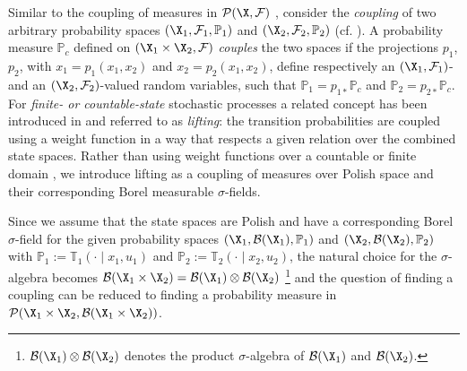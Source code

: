 \documentclass[letterpaper, 10 pt, conference]{amsart}
\theoremstyle{definition}
\theoremstyle{example}
\theoremstyle{remark}
\newcommand{\po}{\mathbb{P}}     \newcommand{\p}[1]{\po\left(#1\right)}     \newcommand{\pd}[1]{p\left(#1\right)}     \newcommand{\borel}[1]{\mathcal{B}\left(#1\right)}
\begin{document}
Similar to the coupling of measures in $\mathcal{P}(\X,\mathcal F)$ \cite{art2014,lindvall2002lectures}, 
consider the \emph{coupling} of two arbitrary probability spaces $(\X_1,\mathcal F_1,\po_1)$ and $(\X_2,\mathcal F_2,\po_2)$ (cf. \cite{skala1993,strassen1965}).  
A probability measure $\po_c$ 
defined on $(\X_1\times \X_2, \mathcal F)$ \emph{couples} the two spaces if the projections $p_1$, $p_2$,  
with $x_1=p_1(x_1,x_2)$ and $x_2=p_2(x_1,x_2)$, 
define respectively an $(\X_1,\mathcal F_1)$- and an $(\X_2,\mathcal F_2)$-valued random variables, 
such that $\po_1=p_{1\ast}\po_c$ and $\po_2=p_{2\ast} \po_c$.   
For \emph{finite- or countable-state} stochastic processes a related concept has been introduced in \cite{Segala1995,Segala1995a}  
and referred to as \emph{lifting}:  
the transition probabilities are coupled using a weight function in a way that respects a given relation over the combined state spaces. Rather than using weight functions over a countable or finite domain \cite{Segala1995}, 
we introduce lifting as a coupling of measures over Polish space and their corresponding Borel measurable $\sigma$-fields. 


Since we assume that the state spaces are Polish and have a corresponding Borel $\sigma$-field for the given probability spaces $(\X_1,\mathcal B(\X_1),\mathbb{P}_1)$ and $(\X_2,\mathcal B(\X_2),\mathbb{P}_2)$ with 
  $\mathbb{P}_1:=\mathbb T_1(\cdot\mid x_1,u_1)$  and $\mathbb{P}_2:=\mathbb T_2(\cdot\mid x_2,u_2)$, the natural choice for the $\sigma$-algebra becomes  $\mathcal B(\X_1\times \X_2)=\mathcal{B}(\X_1)\otimes\mathcal{B}(\X_2)$ \footnote{ $\mathcal B(\X_1) \otimes\mathcal{B}( \X_2)$ denotes the product $\sigma$-algebra of $\mathcal B(\X_1)$ and $\mathcal{B}( \X_2)$.}  and the question of finding a coupling can be reduced to finding a probability measure in  $\mathcal P(\X_1\times\X_2,\mathcal B(\X_1\times \X_2))$.  
 
\end{document}
